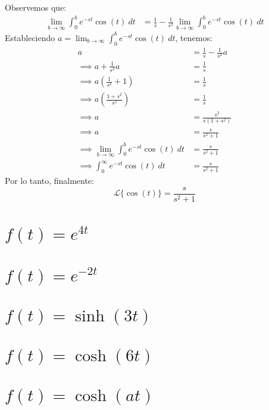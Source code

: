 \documentclass[12pt, a4paper]{article}
\begin{document}
Observemos que:
\begin{align*}
	\lim_{b \to \infty} \int_{0}^{b} e^{-st} \cos (t) \ dt &= \frac{1}{s} - \frac{1}{s^{2}}\lim_{b \to \infty} \int_{0}^{b} e^{-st} \cos (t) \ dt
\end{align*}
Estableciendo \(a = \lim_{b \to \infty} \int_{0}^{b} e^{-st} \cos (t) \ dt\), tenemos:
\begin{align*}
	a &= \frac{1}{s} - \frac{1}{s ^{2}} a \\
	\implies a + \frac{1}{s ^{2}} a &= \frac{1}{s} \\
	\implies a \left(\frac{1}{s ^{2}} + 1 \right) &= \frac{1}{s} \\
	\implies a \left( \frac{1+s ^{2}}{s ^{2}} \right) &= \frac{1}{s} \\
	\implies a &= \frac{s ^{2}}{s(1+s ^{2})} \\
	\implies a &= \frac{s}{s ^{2} + 1} \\
	\implies \lim_{b \to \infty} \int_{0}^{b} e^{-st} \cos (t) \ dt &= \frac{s}{s ^{2} + 1} \\
	\implies \int_{0}^{\infty} e^{-st} \cos (t) \ dt &= \frac{s}{s ^{2} + 1}
\end{align*}
Por lo tanto, finalmente:
\[
	\mathcal{L}\{\cos (t)\} = \frac{s}{s ^{2} + 1}
\]


\setcounter{section}{10}
\section{\texorpdfstring{\(f(t)=e^{4t}\)}{f (t) = e (4t) }}


\section{\texorpdfstring{\(f(t)=e^{-2t}\)}{f (t) = e (-2t)}}


\setcounter{section}{13}
\section{\texorpdfstring{\(f(t)=\sinh(3t)\)}{f (t) = sinh (3t)}}


\section{\texorpdfstring{\(f(t)=\cosh(6t)\)}{f (t) = cosh (6t)}}


\setcounter{section}{16}
\section{\texorpdfstring{\(f(t)=\cosh(at)\)}{f (t) = cosh (at)}}
\end{document}
